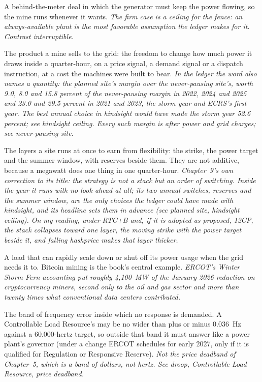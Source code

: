 \begin{description}[leftmargin=0pt,style=unboxed,itemsep=0.35em,parsep=0.15em]
\item[firm supply] \hypertarget{glossary:firm-supply}{}A behind-the-meter deal in which the generator must keep the power flowing, so the mine runs whenever it wants. \emph{The firm case is a ceiling for the fence: an always-available plant is the most favorable assumption the ledger makes for it. Contrast interruptible.}
\item[flexibility] \hypertarget{glossary:flexibility}{}The product a mine sells to the grid: the freedom to change how much power it draws inside a quarter-hour, on a price signal, a demand signal or a dispatch instruction, at a cost the machines were built to bear. \emph{In the ledger the word also names a quantity: the planned site's margin over the never-pausing site's, worth 9.0, 8.0 and 15.8 percent of the never-pausing margin in 2022, 2024 and 2025 and 23.0 and 29.5 percent in 2021 and 2023, the storm year and ECRS's first year. The best annual choice in hindsight would have made the storm year 52.6 percent; see hindsight ceiling. Every such margin is after power and grid charges; see never-pausing site.}
\item[the flexibility stack (the stack)] \hypertarget{glossary:the-flexibility-stack}{}The layers a site runs at once to earn from flexibility: the strike, the power target and the summer window, with reserves beside them. They are not additive, because a megawatt does one thing in one quarter-hour. \emph{Chapter~9's own correction to its title: the strategy is not a stack but an order of switching. Inside the year it runs with no look-ahead at all; its two annual switches, reserves and the summer window, are the only choices the ledger could have made with hindsight, and its headline sets them in advance (see planned site, hindsight ceiling). On my reading, under RTC+B and, if it is adopted as proposed, 12CP, the stack collapses toward one layer, the moving strike with the power target beside it, and falling hashprice makes that layer thicker.}
\item[flexible load] \hypertarget{glossary:flexible-load}{}A load that can rapidly scale down or shut off its power usage when the grid needs it to. Bitcoin mining is the book's central example. \emph{ERCOT's Winter Storm Fern accounting put roughly 4,100~MW of the January 2026 reduction on cryptocurrency miners, second only to the oil and gas sector and more than twenty times what conventional data centers contributed.}
\item[frequency deadband] \hypertarget{glossary:frequency-deadband}{}The band of frequency error inside which no response is demanded. A Controllable Load Resource's may be no wider than plus or minus 0.036~Hz against a 60.000-hertz target, so outside that band it must answer like a power plant's governor (under a change ERCOT schedules for early 2027, only if it is qualified for Regulation or Responsive Reserve). \emph{Not the price deadband of Chapter~5, which is a band of dollars, not hertz. See droop, Controllable Load Resource, price deadband.}

\end{description}
